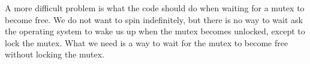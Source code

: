 \documentclass[natbib,sort&compress]{sigplanconf}
\begin{document}
A more difficult problem is what the code should do when waiting for
a mutex to become free.  We do not want to spin indefinitely, but
there is no way to wait ask the operating system to wake us up when
the mutex becomes unlocked, except to lock the mutex.  What we need is
a way to wait for the mutex to become free without locking the mutex. 



\end{document}
